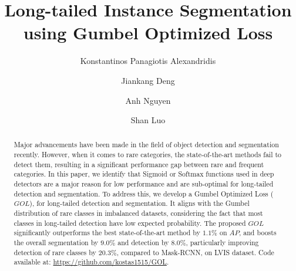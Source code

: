 \documentclass[runningheads]{llncs}
\begin{document}
\pagestyle{headings}
\mainmatter
\def\ECCVSubNumber{6148}  

\title{Long-tailed Instance Segmentation using
Gumbel Optimized Loss} 

\begin{comment}
\titlerunning{ECCV-22 submission ID \ECCVSubNumber} 
\authorrunning{ECCV-22 submission ID \ECCVSubNumber} 
\author{Anonymous ECCV submission}
\institute{Paper ID \ECCVSubNumber}
\end{comment}


\author{Konstantinos Panagiotis Alexandridis\Envelope \and
Jiankang Deng \and
Anh Nguyen \and
Shan Luo
}


\maketitle

\begin{abstract}
Major advancements have been made in the field of object detection and segmentation recently. However, when it comes to rare categories, the state-of-the-art methods fail to detect them, resulting in a significant performance gap between rare and frequent categories. In this paper, we identify that Sigmoid or Softmax functions used in deep detectors are a major reason for low performance and are sub-optimal for long-tailed  detection and segmentation. To address this, we develop a Gumbel Optimized Loss ($GOL$), for long-tailed  detection and segmentation. It aligns with the Gumbel distribution of rare classes in imbalanced datasets, considering the fact that most classes in long-tailed detection have low expected probability. The proposed $GOL$ significantly outperforms the best state-of-the-art method by $1.1\%$ on $AP$, and boosts the overall segmentation by $9.0\%$ and detection by $8.0\%$, particularly improving detection of rare classes by $20.3\%$, compared to Mask-RCNN, on LVIS dataset. Code available at: \url{https://github.com/kostas1515/GOL}.
\end{abstract}
\end{document}
